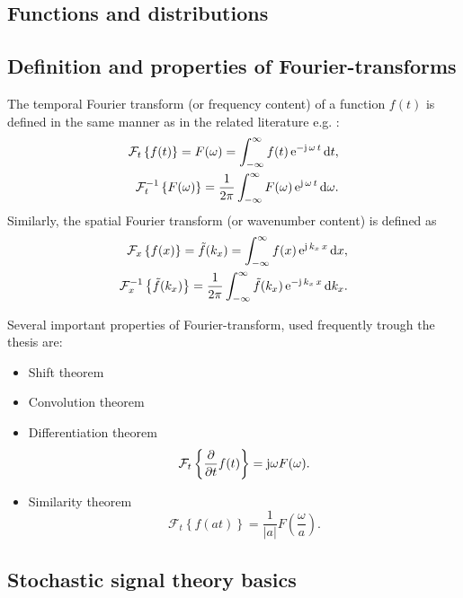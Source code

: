 \subsection{Functions and distributions}
\subsection{Definition and properties of Fourier-transforms}

The temporal Fourier transform (or frequency content) of a function $f(t)$ is defined in the same manner as in the related literature e.g. \cite{Ahrens2012, Ahrens2010a}:
%
\begin{align}
\mathcal{F}_{t} \left\{  f(t) \right\}  = F(\omega) = \int_{-\infty}^{\infty} f(t) \, \mathrm{e}^{-\mathrm{j} \,\omega \, t} \, \mathrm{d} t, \\
\mathcal{F}^{-1}_{t} \left\{  F(\omega) \right\}  = \frac{1}{2\pi} \int_{-\infty}^{\infty} F(\omega)\, \mathrm{e}^{\mathrm{j}\, \omega\, t} \, \mathrm{d} \omega.
\label{Eq:Math:Temp_Fourier}
\end{align}
%
Similarly, the spatial Fourier transform (or wavenumber content) is defined as
%
\begin{align}
\mathcal{F}_{x} \left\{  f(x) \right\}  = \tilde{f}(k_x) = \int_{-\infty}^{\infty} f(x)\, \mathrm{e}^{\mathrm{j}\, k_x\, x}\, \mathrm{d} x, \\
\mathcal{F}^{-1}_{x} \left\{  \tilde{f}(k_x) \right\}  = \frac{1}{2\pi} \int_{-\infty}^{\infty} \tilde{f}(k_x)\, \mathrm{e}^{-\mathrm{j}\, k_x\, x}\, \mathrm{d} k_x.
\end{align}

Several important properties of Fourier-transform, used frequently trough the thesis are:
\begin{itemize}
\item Shift theorem
%
\item Convolution theorem
%
\item Differentiation theorem
\begin{equation}
\mathcal{F}_{t} \left\{ \frac{\partial}{\partial t} f(t) \right\}  = \mathrm{j} \omega F(\omega).
\label{Eq:Math:Fourier_tr_diff}
\end{equation}
%
\item Similarity theorem
\begin{equation}
\mathcal{F}_{t} \left\{ f(a t) \right\}  = \frac{1}{|a|} F(\frac{\omega}{a}).
\label{Eq:Math:Fourier_tr_similarity}
\end{equation}
\end{itemize}
  

\subsection{Stochastic signal theory basics}